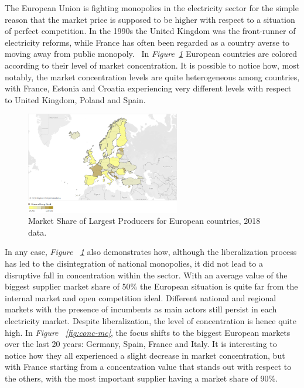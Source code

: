 \documentclass[a4paper,12pt]{book}
\begin{document}
The European Union is fighting monopolies in the electricity sector for the simple reason that the market price is supposed to be higher with respect to a situation of perfect competition. In the 1990s the United Kingdom was the front-runner of electricity reforms, while France has often been regarded as a country averse to moving away from public monopoly.~\cite{fiorio2009reform} In \textit{Figure~\ref{fig:conc}} European countries are colored according to their level of market concentration. It is possible to notice how, most notably, the market concentration levels are quite heterogeneous among countries, with France, Estonia and Croatia experiencing very different levels with respect to United Kingdom, Poland and Spain.

\begin{figure}[tb]
\begin{center}
\captionsetup{justification=centering}
\includegraphics[width=0.6\textwidth]{Images/conc.png}
\caption{Market Share of Largest Producers for European countries, 2018 data. }
\label{fig:conc}
\end{center}
\end{figure}

In any case, \textit{Figure ~\ref{fig:conc}} also demonstrates how, although the liberalization process has led to the disintegration of national monopolies, it did not lead to a disruptive fall in concentration within the sector. With an average value of the biggest  supplier market share of 50\% the European situation is quite far from the internal market and open competition ideal. Different national and regional markets with the presence of incumbents as main actors still persist in each electricity market. Despite liberalization, the level of concentration is hence quite high.  In \textit{Figure ~\ref{fig:conc-mc}}, the focus shifts to the biggest European markets over the last 20 years: Germany, Spain, France and Italy. It is interesting to notice how they all experienced a slight decrease in market concentration, but with France starting from a concentration value that stands out with respect to the others, with the most important supplier having a market share of 90\%.
\end{document}
